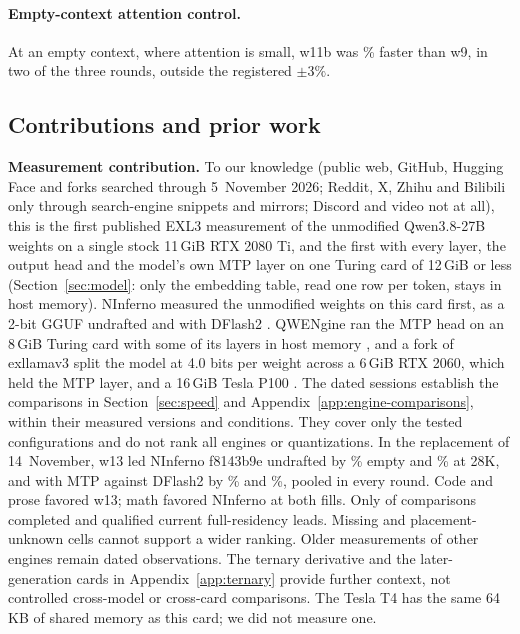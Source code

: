 \documentclass[11pt,letterpaper]{article}
\begin{document}
\paragraph{Empty-context attention control.}
At an empty context, where attention is small, w11b was
\PeDepthTwoZeroGain\% faster than w9, in two of the three rounds, outside the
registered $\pm3\%$. \subsection{Contributions and prior work}
\label{sec:new}
\textbf{Measurement contribution.} To our knowledge (public web, GitHub, Hugging Face
and forks searched through 5~November 2026; Reddit, X, Zhihu and Bilibili only
through search-engine snippets and mirrors; Discord and video not at all),
this is the first published EXL3 measurement of the unmodified Qwen3.8-27B
weights on a single stock 11\,GiB RTX 2080 Ti, and the first with every
layer, the output head and the model's own MTP layer on one Turing card of
12\,GiB or less (Section~\ref{sec:model}: only the embedding table, read one
row per token, stays in host memory).
NInferno measured the unmodified weights on this card first, as a 2-bit GGUF
undrafted and with DFlash2 \citep{brontir2026ninferno}. QWENgine ran the MTP
head on an 8\,GiB Turing card with some of its layers in host memory
\citep{bensaad2026qwengine}, and a fork of exllamav3 split the model at
4.0 bits per weight across a 6\,GiB RTX 2060, which held the MTP layer, and a
16\,GiB Tesla P100 \citep{trisert2026pascal}. The dated sessions establish the comparisons in Section~\ref{sec:speed} and Appendix~\ref{app:engine-comparisons}, within their measured versions and conditions. They cover only the tested configurations and
do not rank all engines or quantizations. In the replacement of 14~November, w13 led
NInferno f8143b9e undrafted by \PeFreshPNifNdZero\% empty and
\PeFreshPNifNdDeep\% at 28K, and with MTP against DFlash2 by
\PeFreshPNifDfZero\% and \PeFreshPNifDfDeep\%, pooled in every round.
Code and prose favored w13; math favored NInferno at both fills.
Only \PeFreshComplete{} of \PeFreshPlanned{} comparisons completed and
\PeFreshEligible{} qualified current full-residency leads. Missing and
placement-unknown cells cannot support a wider ranking. Older measurements
of other engines remain dated observations. The ternary derivative and the
later-generation cards in Appendix~\ref{app:ternary} provide further context,
not controlled cross-model or cross-card comparisons. The Tesla T4 has the
same 64\,KB of shared memory as this card; we did not measure one.
\end{document}
